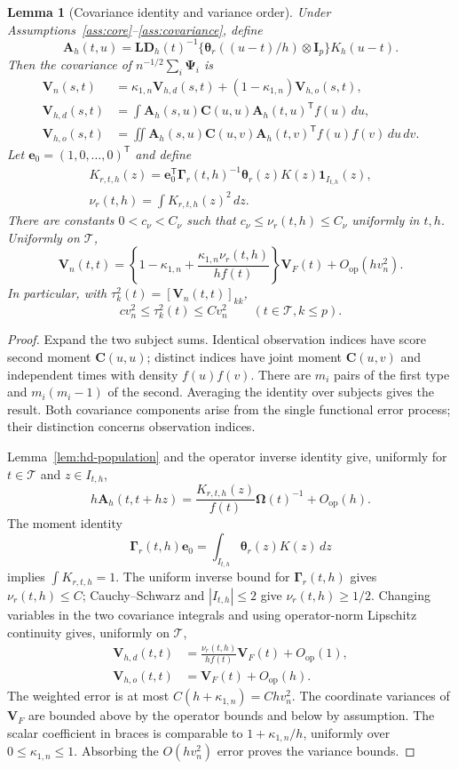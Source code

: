 \documentclass[10pt]{book}
\newtheorem{lemma}{Lemma}
\newcommand{\be}{{\mathbf e}}
\newcommand{\bA}{{\mathbf A}}
\newcommand{\bC}{{\mathbf C}}
\newcommand{\bD}{{\mathbf D}}
\newcommand{\bI}{{\mathbf I}}
\newcommand{\bL}{{\mathbf L}}
\newcommand{\bV}{{\mathbf V}}
\newcommand{\btheta}  {\boldsymbol{\theta}}
\newcommand{\bGamma} {\boldsymbol{\Gamma}}
\newcommand{\bPsi} {\boldsymbol{\Psi}}
\newcommand{\bOmega} {\boldsymbol{\Omega}}
\newcommand{\trans}{{\scriptscriptstyle\mathsf{T}}}
\numberwithin{equation}{section}
\begin{document}
\begin{lemma}[Covariance identity and variance order]
\label{lem:hd-covariance}
Under Assumptions~\ref{ass:core}--\ref{ass:covariance}, define
\[
\bA_h(t,u)=\bL\bD_h(t)^{-1}
\{\btheta_r((u-t)/h)\otimes\bI_p\}K_h(u-t).
\]
Then the covariance of $n^{-1/2}\sum_i\bPsi_i$ is
\[
\begin{split}
\bV_n(s,t)&=\kappa_{1,n}\bV_{h,d}(s,t)
+(1-\kappa_{1,n})\bV_{h,o}(s,t),\\
\bV_{h,d}(s,t)&=\int\bA_h(s,u)\bC(u,u)\bA_h(t,u)^\trans f(u)\,du,\\
\bV_{h,o}(s,t)&=\iint\bA_h(s,u)\bC(u,v)
\bA_h(t,v)^\trans f(u)f(v)\,du\,dv.
\end{split}
\]
Let $\be_0=(1,0,\ldots,0)^\trans$ and define
\[
\begin{gathered}
K_{r,t,h}(z)=\be_0^\trans\bGamma_r(t,h)^{-1}
\btheta_r(z)K(z)\mathbf1_{I_{t,h}}(z),\\
\nu_r(t,h)=\int K_{r,t,h}(z)^2\,dz.
\end{gathered}
\]
There are constants $0<c_\nu<C_\nu$ such that
$c_\nu\le\nu_r(t,h)\le C_\nu$ uniformly in $t,h$.
Uniformly on $\mathcal T$,
\[
\bV_n(t,t)=\left\{1-\kappa_{1,n}+
\frac{\kappa_{1,n}\nu_r(t,h)}{h f(t)}\right\}\bV_F(t)
+O_{\mathrm{op}}(hv_n^2).
\]
In particular, with $\tau_k^2(t)=[\bV_n(t,t)]_{kk}$,
\[
cv_n^2\le\tau_k^2(t)\le Cv_n^2\qquad(t\in\mathcal T, k\le p).
\]
\end{lemma}

\begin{proof}
Expand the two subject sums.  Identical observation indices have
score second moment $\bC(u,u)$; distinct indices have joint moment
$\bC(u,v)$ and independent times with density $f(u)f(v)$.
There are $m_i$ pairs of the first type and $m_i(m_i-1)$ of the
second.  Averaging the identity over subjects gives the result.
Both covariance components arise from the single functional error
process; their distinction concerns observation indices.

Lemma~\ref{lem:hd-population} and the operator inverse identity give,
uniformly for $t\in\mathcal T$ and $z\in I_{t,h}$,
\[
h\bA_h(t,t+hz)=\frac{K_{r,t,h}(z)}{f(t)}\bOmega(t)^{-1}
+O_{\mathrm{op}}(h).
\]
The moment identity
\[
\bGamma_r(t,h)\be_0=\int_{I_{t,h}}\btheta_r(z)K(z)\,dz
\]
implies $\int K_{r,t,h}=1$. The uniform inverse bound for
$\bGamma_r(t,h)$ gives $\nu_r(t,h)\le C$; Cauchy--Schwarz and
$|I_{t,h}|\le2$ give $\nu_r(t,h)\ge1/2$.
Changing variables in the two covariance integrals and using
operator-norm Lipschitz continuity gives, uniformly on $\mathcal T$,
\[
\begin{aligned}
\bV_{h,d}(t,t)&=\frac{\nu_r(t,h)}{hf(t)}\bV_F(t)
+O_{\mathrm{op}}(1),\\
\bV_{h,o}(t,t)&=\bV_F(t)+O_{\mathrm{op}}(h).
\end{aligned}
\]
The weighted error is at most $C(h+\kappa_{1,n})=Chv_n^2$.
The coordinate variances of $\bV_F$ are bounded above by the
operator bounds and below by assumption.  The scalar coefficient
in braces is comparable to $1+\kappa_{1,n}/h$, uniformly over
$0\le\kappa_{1,n}\le1$.  Absorbing the $O(hv_n^2)$ error proves
the variance bounds.
\end{proof}
\end{document}
